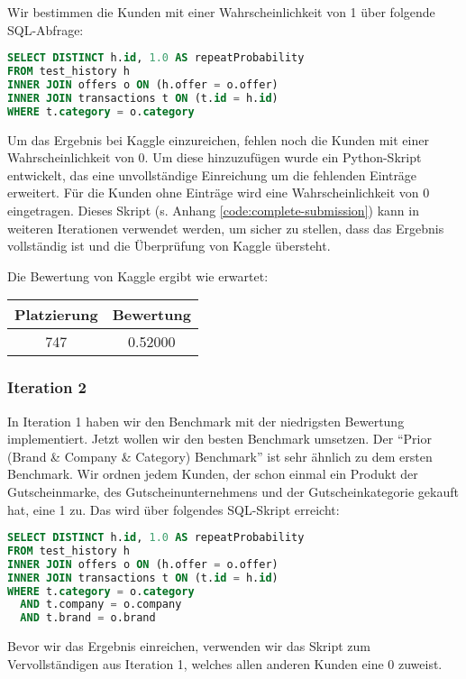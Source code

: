 Wir bestimmen die Kunden mit einer Wahrscheinlichkeit von 1 über folgende SQL-Abfrage:
\begin{lstlisting}[language=SQL]
SELECT DISTINCT h.id, 1.0 AS repeatProbability
FROM test_history h 
INNER JOIN offers o ON (h.offer = o.offer)
INNER JOIN transactions t ON (t.id = h.id)
WHERE t.category = o.category
\end{lstlisting}

Um das Ergebnis bei Kaggle einzureichen, fehlen noch die Kunden mit einer Wahrscheinlichkeit von 0.
Um diese hinzuzufügen wurde ein Python-Skript entwickelt, das eine unvollständige Einreichung
um die fehlenden Einträge erweitert. Für die Kunden ohne Einträge wird eine Wahrscheinlichkeit von 0 eingetragen.
Dieses Skript (s. Anhang \ref{code:complete-submission}) kann in weiteren Iterationen verwendet werden,
um sicher zu stellen, dass das Ergebnis vollständig ist und die Überprüfung von Kaggle übersteht. 

Die Bewertung von Kaggle ergibt wie erwartet:

\begin{tabular}{|c|c|}
	\hline \textbf{Platzierung} & \textbf{Bewertung} \\ 
	\hline 747 & 0.52000  \\ 
	\hline 
\end{tabular}

\subsubsection{Iteration 2}

In Iteration 1 haben wir den Benchmark mit der niedrigsten Bewertung implementiert. Jetzt wollen wir 
den besten Benchmark umsetzen. Der "`Prior (Brand \& Company \& Category) Benchmark"' ist sehr ähnlich
zu dem ersten Benchmark. Wir ordnen jedem Kunden, der schon einmal ein Produkt der Gutscheinmarke,
des Gutscheinunternehmens und der Gutscheinkategorie gekauft hat, eine 1 zu. 
Das wird über folgendes SQL-Skript erreicht:

\begin{lstlisting}[language=SQL]
SELECT DISTINCT h.id, 1.0 AS repeatProbability
FROM test_history h 
INNER JOIN offers o ON (h.offer = o.offer)
INNER JOIN transactions t ON (t.id = h.id)
WHERE t.category = o.category
  AND t.company = o.company
  AND t.brand = o.brand
\end{lstlisting}

Bevor wir das Ergebnis einreichen, verwenden wir das Skript zum Vervollständigen aus Iteration 1, welches allen anderen Kunden eine 0 zuweist.

